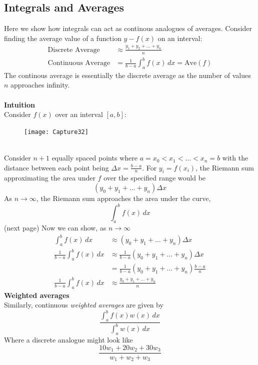 \documentclass{report}
\begin{document}
\subsection{Integrals and Averages} %
Here we show how integrals can act as continous analogues of averages. Consider
finding the average value of a function $y-f(x)$ on an interval:
\begin{align*}
\text{Discrete Average}&\approx\frac{y_1+y_2+\ldots+y_n}{n}\\
\text{Continuous Average}&=\frac{1}{b-a}\int_a^bf(x)\,dx=\text{Ave}(f)
\end{align*} 
The continous average is essentially the discrete average as the number of values $n$ 
approaches infinity.\\
\vspace{1mm}\\
\textbf{Intuition}\\
Consider $f(x)$ over an interval $[a,b]$:
\begin{figure}[h]
\texttt{[image: Capture32]}\\
\centering
{}
\end{figure}\\
Consider $n+1$ equally spaced points where $a=x_0<x_1<\ldots<x_n=b$
with the distance between each point being $\Delta x=\frac{b-a}{n}$. 
For $y_i=f(x_i)$, the Riemann sum approximating the area under $f$ over 
the specified range would be
\begin{equation*}
(y_0+y_1+\ldots+y_n)\Delta x
\end{equation*}
As $n\to\infty$, the Riemann sum approaches the area under the curve, 
\begin{equation*}
\int_a^bf(x)\,dx
\end{equation*}
(next page)
\newpage
\noindent Now we can show, as $n\to\infty$
\begin{align*}
\int_a^bf(x)\,dx&\approx(y_0+y_1+\ldots+y_n)\Delta x\\
\frac{1}{b-a}\int_a^bf(x)\,dx&\approx
\frac{1}{b-a}(y_0+y_1+\ldots+y_n)\Delta x\\
&=\frac{1}{b-a}(y_0+y_1+\ldots+y_n)\frac{b-a}{n}\\
\frac{1}{b-a}\int_a^bf(x)\,dx&\approx\frac{y_0+y_1+\ldots+y_n}{n}
\end{align*}
\textbf{Weighted averages}\\
Similarly, continuous \textit{weighted averages} are given by
\begin{equation*}
\frac{\int_a^b f(x)w(x)\,dx}{\int_a^b w(x)\,dx}
\end{equation*}
Where a discrete analogue might look like
\begin{equation*}
\frac{10w_1+20w_2+30w_3}{w_1+w_2+w_3}
\end{equation*}
\newpage
\end{document}
